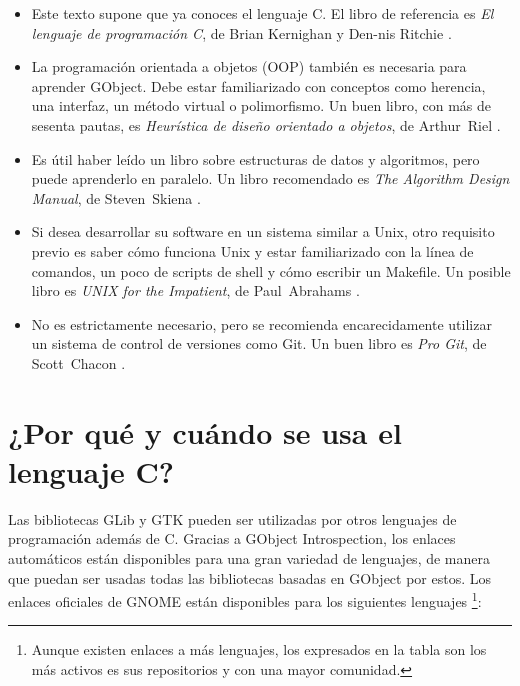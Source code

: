 \begin{itemize}
    \item Este texto supone que ya conoces el lenguaje C. El libro de referencia es \emph{El lenguaje de programación C}, de Brian Kernighan y Den-nis Ritchie \cite{k-r-book}.
    
    \item La programación orientada a objetos (OOP) también es necesaria para aprender GObject. Debe estar familiarizado con conceptos como herencia, una interfaz, un método virtual o polimorfismo. Un buen libro, con más de sesenta pautas, es \emph{Heurística de diseño orientado a objetos}, de Arthur~Riel \cite{oop-book}.
    
    \item Es útil haber leído un libro sobre estructuras de datos y algoritmos, pero puede aprenderlo en paralelo. Un libro recomendado es \emph{The Algorithm Design Manual}, de Steven~Skiena \cite{algo-book}.
    
    \item Si desea desarrollar su software en un sistema similar a Unix, otro requisito previo es saber cómo funciona Unix y estar familiarizado con la línea de comandos, un poco de scripts de shell y cómo escribir un Makefile. Un posible libro es \emph{UNIX for the Impatient}, de Paul~Abrahams \cite{unix-impatient}.
    
    \item No es estrictamente necesario, pero se recomienda encarecidamente utilizar un sistema de control de versiones como Git. Un buen libro es \emph{Pro Git}, de Scott~Chacon \cite{pro-git}.
\end{itemize}

\section{¿Por qué y cuándo se usa el lenguaje C?}

Las bibliotecas GLib y GTK pueden ser utilizadas por otros lenguajes de programación además de C. Gracias a GObject Introspection, los enlaces automáticos están disponibles para una gran variedad de lenguajes, de manera que puedan ser usadas todas las bibliotecas basadas en GObject por estos. Los enlaces oficiales de GNOME están disponibles para los siguientes lenguajes \footnote{Aunque existen enlaces a más lenguajes, los expresados en la tabla son los más activos es sus repositorios y con una mayor comunidad.}:

